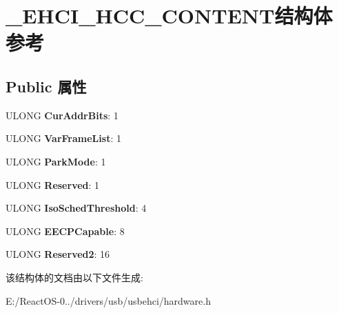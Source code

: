\hypertarget{struct___e_h_c_i___h_c_c___c_o_n_t_e_n_t}{}\section{\+\_\+\+E\+H\+C\+I\+\_\+\+H\+C\+C\+\_\+\+C\+O\+N\+T\+E\+N\+T结构体 参考}
\label{struct___e_h_c_i___h_c_c___c_o_n_t_e_n_t}
\subsection*{Public 属性}
\begin{DoxyCompactItemize}
\item 
\mbox{\label{struct___e_h_c_i___h_c_c___c_o_n_t_e_n_t_a924bcf98e72533115b362e469fbcfff8}} 
U\+L\+O\+NG {\bfseries Cur\+Addr\+Bits}\+: 1
\item 
\mbox{\label{struct___e_h_c_i___h_c_c___c_o_n_t_e_n_t_a0f19c4e86ca72319095a23bfde051edf}} 
U\+L\+O\+NG {\bfseries Var\+Frame\+List}\+: 1
\item 
\mbox{\label{struct___e_h_c_i___h_c_c___c_o_n_t_e_n_t_aa0dbb78bcae10cc1817d88d12030feb1}} 
U\+L\+O\+NG {\bfseries Park\+Mode}\+: 1
\item 
\mbox{\label{struct___e_h_c_i___h_c_c___c_o_n_t_e_n_t_a3d7d876a5a2bba5eab86aa06370de08f}} 
U\+L\+O\+NG {\bfseries Reserved}\+: 1
\item 
\mbox{\label{struct___e_h_c_i___h_c_c___c_o_n_t_e_n_t_a90e451568acd166cb10f3038eb53b534}} 
U\+L\+O\+NG {\bfseries Iso\+Sched\+Threshold}\+: 4
\item 
\mbox{\label{struct___e_h_c_i___h_c_c___c_o_n_t_e_n_t_ad4c7c49c529a733d1273600f34fb4852}} 
U\+L\+O\+NG {\bfseries E\+E\+C\+P\+Capable}\+: 8
\item 
\mbox{\label{struct___e_h_c_i___h_c_c___c_o_n_t_e_n_t_a95dc669dfcd23d96008cc1db36e141d8}} 
U\+L\+O\+NG {\bfseries Reserved2}\+: 16
\end{DoxyCompactItemize}


该结构体的文档由以下文件生成\+:\begin{DoxyCompactItemize}
\item 
E\+:/\+React\+O\+S-\/0../drivers/usb/usbehci/hardware.\+h\end{DoxyCompactItemize}
